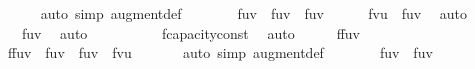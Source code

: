 {\ \ \ \ \isamarkupfalse%
\ {\isacharparenleft}auto\ simp{\isacharcolon}\ augment{\isacharunderscore}def{\isacharparenright}\isanewline
\ \ \isamarkupfalse%
\ \isamarkupfalse%
\ {\isachardoublequoteopen}{\isasymdots}\ {\isasymge}\ f{\isacharparenleft}u{\isacharcomma}v{\isacharparenright}\ {\isacharplus}\ f{\isacharprime}{\isacharparenleft}u{\isacharcomma}v{\isacharparenright}\ {\isacharminus}\ f{\isacharparenleft}u{\isacharcomma}v{\isacharparenright}{\isachardoublequoteclose}\isanewline
\ \ \ \ \isamarkupfalse%
\ {\isacartoucheopen}f{\isacharprime}{\isacharparenleft}v{\isacharcomma}u{\isacharparenright}\ {\isasymle}\ f{\isacharparenleft}u{\isacharcomma}v{\isacharparenright}{\isacartoucheclose}\ \isamarkupfalse%
\ auto\isanewline
\ \ \isamarkupfalse%
\ \isamarkupfalse%
\ {\isachardoublequoteopen}{\isasymdots}\ {\isacharequal}\ f{\isacharprime}{\isacharparenleft}u{\isacharcomma}v{\isacharparenright}{\isachardoublequoteclose}\ \isamarkupfalse%
\ auto\isanewline
\ \ \isamarkupfalse%
\ \isamarkupfalse%
\ {\isachardoublequoteopen}{\isasymdots}\ {\isasymge}\ {}{\isachardoublequoteclose}\ \isamarkupfalse%
\ f{\isacharprime}{\isachardot}capacity{\isacharunderscore}const\ \isamarkupfalse%
\ auto\isanewline
\ \ \isamarkupfalse%
\ \isamarkupfalse%
\ {\isachardoublequoteopen}{\isacharparenleft}f{\isasymup}f{\isacharprime}{\isacharparenright}{\isacharparenleft}u{\isacharcomma}v{\isacharparenright}\ {\isasymge}\ {}{\isachardoublequoteclose}\ \isacommand{{\isachardot}}\isamarkupfalse%
\isanewline
\ \ \ \ \ \ \isanewline
\ \ \isamarkupfalse%
\ {\isachardoublequoteopen}{\isacharparenleft}f{\isasymup}f{\isacharprime}{\isacharparenright}{\isacharparenleft}u{\isacharcomma}v{\isacharparenright}\ {\isacharequal}\ f{\isacharparenleft}u{\isacharcomma}v{\isacharparenright}\ {\isacharplus}\ f{\isacharprime}{\isacharparenleft}u{\isacharcomma}v{\isacharparenright}\ {\isacharminus}\ f{\isacharprime}{\isacharparenleft}v{\isacharcomma}u{\isacharparenright}{\isachardoublequoteclose}\ \isanewline
\ \ \ \ \isamarkupfalse%
\ {\isacharparenleft}auto\ simp{\isacharcolon}\ augment{\isacharunderscore}def{\isacharparenright}\isanewline
\ \ \isamarkupfalse%
\ \isamarkupfalse%
\ {\isachardoublequoteopen}{\isasymdots}\ {\isasymle}\ f{\isacharparenleft}u{\isacharcomma}v{\isacharparenright}\ {\isacharplus}\ f{\isacharprime}{\isacharparenleft}u{\isacharcomma}v{\isacharparenright}{\isachardoublequoteclose}\ \isamarkupfalse%
}
